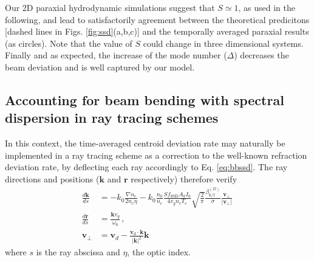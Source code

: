 \documentclass[%
 reprint,
 amsmath,amssymb,
 aps,
]{revtex4-1}
\begin{document}
Our 2D paraxial hydrodynamic simulations suggest that $S\simeq 1$, as used in the following, and  lead to satisfactorily agreement between the theoretical predicitons [dashed lines in Figs. \ref{fig:ssd}(a,b,c)] and the temporally averaged paraxial results (as circles). Note that the  value of $S$ could  change in three dimensional systems. 
%
Finally and as expected, the increase of the  mode number ($\Delta$) decreases the beam deviation and is well captured by our model. 

\subsection{Accounting for beam bending with spectral dispersion in  ray tracing schemes}\label{sec:ray}
In this context, the time-averaged centroid deviation rate  may naturally be implemented in a ray tracing scheme as a correction to the well-known refraction deviation rate, by deflecting each ray accordingly to   Eq. \eqref{eq:bbssd}.
The ray directions and positions ($\mathbf{k}$ and  $\mathbf{r}$ respectively)  therefore verify
\begin{align}
    \frac{d\mathbf{k}}{ds} &=-k_0 \frac{\nabla n_e }{2n_c\eta} -k_0\frac{n_0 }{n_c}  \frac{  S f_\mathrm{SSD} A_kI_0 }{ 4 v_g n_c T_e } \sqrt{\frac{2}{\pi}} \frac{\beta_\mathrm{k/f}^{(D)} }{ \sigma}  \frac{\mathbf{v}_\perp}{\vert \mathbf{v}_\perp \vert }\, \nonumber\\
        \frac{d\mathbf{r}}{ds} &= \frac{\mathbf{k}v_g}{\omega_0} \, , \nonumber\\
    \mathbf{v}_\perp&= \mathbf{v}_d - \frac{ \mathbf{v}_d\cdot \mathbf{k}}{\vert  \mathbf{k}\vert^2}\mathbf{k}\, \label{eq:raybb}
\end{align}
where $s$ is the ray abscissa and $\eta$, the optic index.
\end{document}
